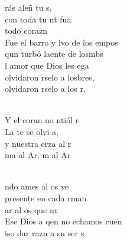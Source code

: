 \documentclass[12pt]{article}
\begin{document}
\begin{multicols*}{2}
\begin{cancion}%
	rás aleñ tu s, \\
	con toda tu nt fua\\
	 todo  corazn   \\
\jump
	Fue el barro y lvo de los empos\\
	qun turbó laente de losmbs \\
	l amor que Dios les ega \\
	olvidaron rselo a losbres,\\
	olvidaron rselo a los r. \\\jump\\
	\begin{chorus}%
	Y el coran no ntiól r \\
	La te se olvi a,\\
	y nuestra erza al r\\
	ma al Ar, m al Ar  \\
	\end{chorus}%
	\jump\\
	ndo ames al os  ve\\
	presente en cada rman \\
	ar al os que nv   \\
\jump
	Ese Dios a qen no echamos cuen\\
	iso dar razn a su ser s\\

\end{cancion}
\end{multicols*}
\end{document}
